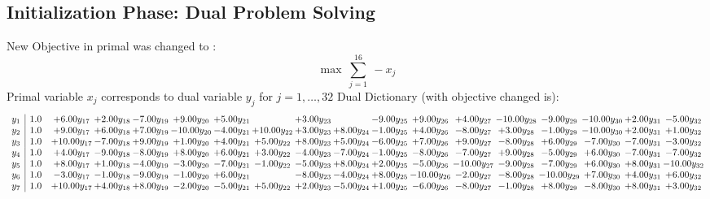 \documentclass[9pt]{article}
\begin{document}
\subsection{Initialization Phase: Dual Problem Solving}
New Objective in primal was changed to : \[ \max\ \sum_{j=1}^{16}\ - x_j \] 
Primal variable $x_j$ corresponds to dual variable $y_j$ for $j = 1,\ldots,32$
Dual Dictionary (with objective changed is): 
\[\begin{array}{c| c c@{\hskip 2pt} c@{\hskip 2pt} c@{\hskip 2pt} c@{\hskip 2pt} c@{\hskip 2pt} c@{\hskip 2pt} c@{\hskip 2pt} c@{\hskip 2pt} c@{\hskip 2pt} c@{\hskip 2pt} c@{\hskip 2pt} c@{\hskip 2pt} c@{\hskip 2pt} c@{\hskip 2pt} c@{\hskip 2pt} c@{\hskip 2pt} }
 y_{1}   &  1.0 & +  6.00 y_{17} & +  2.00 y_{18} & -7.00 y_{19} & +  9.00 y_{20} & +  5.00 y_{21} &   & +  3.00 y_{23} &   & -9.00 y_{25} & +  9.00 y_{26} & +  4.00 y_{27} & -10.00 y_{28} & -9.00 y_{29} & -10.00 y_{30} & +  2.00 y_{31} & -5.00 y_{32}\\
 y_{2}   &  1.0 & +  9.00 y_{17} & +  6.00 y_{18} & +  7.00 y_{19} & -10.00 y_{20} & -4.00 y_{21} & + 10.00 y_{22} & +  3.00 y_{23} & +  8.00 y_{24} & -1.00 y_{25} & +  4.00 y_{26} & -8.00 y_{27} & +  3.00 y_{28} & -1.00 y_{29} & -10.00 y_{30} & +  2.00 y_{31} & +  1.00 y_{32}\\
 y_{3}   &  1.0 & + 10.00 y_{17} & -7.00 y_{18} & +  9.00 y_{19} & +  1.00 y_{20} & +  4.00 y_{21} & +  5.00 y_{22} & +  8.00 y_{23} & +  5.00 y_{24} & -6.00 y_{25} & +  7.00 y_{26} & +  9.00 y_{27} & -8.00 y_{28} & +  6.00 y_{29} & -7.00 y_{30} & -7.00 y_{31} & -3.00 y_{32}\\
 y_{4}   &  1.0 & +  4.00 y_{17} & -9.00 y_{18} & -8.00 y_{19} & +  8.00 y_{20} & +  6.00 y_{21} & +  3.00 y_{22} & -4.00 y_{23} & -7.00 y_{24} & -1.00 y_{25} & -8.00 y_{26} & -7.00 y_{27} & +  9.00 y_{28} & -5.00 y_{29} & +  6.00 y_{30} & -7.00 y_{31} & -7.00 y_{32}\\
 y_{5}   &  1.0 & +  8.00 y_{17} & +  1.00 y_{18} & -4.00 y_{19} & -3.00 y_{20} & -7.00 y_{21} & -1.00 y_{22} & -5.00 y_{23} & +  8.00 y_{24} & +  2.00 y_{25} & -5.00 y_{26} & -10.00 y_{27} & -9.00 y_{28} & -7.00 y_{29} & +  6.00 y_{30} & +  8.00 y_{31} & -10.00 y_{32}\\
 y_{6}   &  1.0 & -3.00 y_{17} & -1.00 y_{18} & -9.00 y_{19} & -1.00 y_{20} & +  6.00 y_{21} &   & -8.00 y_{23} & -4.00 y_{24} & +  8.00 y_{25} & -10.00 y_{26} & -2.00 y_{27} & -8.00 y_{28} & -10.00 y_{29} & +  7.00 y_{30} & +  4.00 y_{31} & +  6.00 y_{32}\\
 y_{7}   &  1.0 & + 10.00 y_{17} & +  4.00 y_{18} & +  8.00 y_{19} & -2.00 y_{20} & -5.00 y_{21} & +  5.00 y_{22} & +  2.00 y_{23} & -5.00 y_{24} & +  1.00 y_{25} & -6.00 y_{26} & -8.00 y_{27} & -1.00 y_{28} & +  8.00 y_{29} & -8.00 y_{30} & +  8.00 y_{31} & +  3.00 y_{32}\\

\end{array}\]
\end{document}
